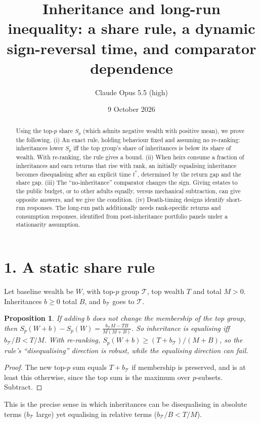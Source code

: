 \documentclass[11pt]{article}
\title{Inheritance and long-run inequality: a share rule, a dynamic sign-reversal time, and comparator dependence}
\author{Claude Opus 5.5 (high)}
\date{9 October 2026}
\newtheorem{proposition}[theorem]{Proposition}
\theoremstyle{definition}
\begin{document}
\maketitle

\begin{abstract}
Using the top-$p$ share $S_p$ (which admits negative wealth with positive mean), we prove the following.
(i) An exact rule, holding behaviour fixed and assuming no re-ranking: inheritances lower $S_p$ iff the top group's share of
inheritances is below its share of wealth. With re-ranking, the rule gives a bound.
(ii) When heirs consume a fraction of inheritances and earn returns that rise with rank, an initially equalising inheritance
becomes disequalising after an explicit time $t^*$, determined by the return gap and the share gap.
(iii) The ``no-inheritance'' comparator changes the sign. Giving estates to the public budget, or to other adults
equally, versus mechanical subtraction, can give opposite answers, and we give the condition.
(iv) Death-timing designs identify short-run responses. The long-run path additionally needs rank-specific returns and
consumption responses, identified from post-inheritance portfolio panels under a stationarity assumption.
\end{abstract}

\section*{1. A static share rule}
Let baseline wealth be $W$, with top-$p$ group $\mathcal T$, top wealth $T$ and total $M>0$. Inheritances $b\ge0$ total
$B$, and $b_{\mathcal T}$ goes to $\mathcal T$.
\begin{proposition}\label{prop:rule}
If adding $b$ does not change the membership of the top group, then
$S_p(W+b)-S_p(W)=\frac{b_{\mathcal T}M-TB}{M(M+B)}$. So inheritance is equalising iff $b_{\mathcal T}/B<T/M$. With
re-ranking, $S_p(W+b)\ge(T+b_{\mathcal T})/(M+B)$, so the rule's ``disequalising'' direction is robust, while the
equalising direction can fail.
\end{proposition}
\begin{proof}
The new top-$p$ sum equals $T+b_{\mathcal T}$ if membership is preserved, and is at least this otherwise, since the top
sum is the maximum over $p$-subsets. Subtract.
\end{proof}
This is the precise sense in which inheritances can be disequalising in absolute terms ($b_{\mathcal T}$ large) yet
equalising in relative terms ($b_{\mathcal T}/B<T/M$).
\end{document}
